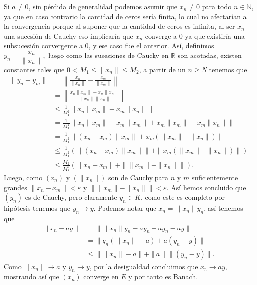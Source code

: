 \begin{sproof}
  Si $a\neq 0$, sin pérdida de generalidad podemos asumir que $x_n\neq 0$ para todo $n\in \mathbb{N}$, ya que en caso contrario la cantidad de ceros sería finita, lo cual no afectarían a la convergencia porque al suponer que la cantidad de ceros es infinita, al ser $x_n$ una sucesión de Cauchy eso implicaría que $x_n$ converge a $0$ ya que existiría una subsucesión convergente a $0$, y ese caso fue el anterior. Así, definimos $y_n=\dfrac{x_n}{\|x_n\|},$ luego como las sucesiones de Cauchy en $\mathbb{R}$ son acotadas, existen constantes tales que $0<M_1\leq\|x_n\|\leq M_2$, a partir de un $n\geq N$ tenemos que   
  \begin{align*}
      \|y_n-y_m\|&=\left\|\frac{x_n}{\|x_n\|}-\frac{x_m}{\|x_m\|}\right\|\\
      &=\left\|\frac{x_n\|x_m\|-x_m\|x_n\|}{\|x_n\|\|x_m\|}\right\|\\
      &\leq\frac{1}{M_1^2}\|x_n\|x_m\|-x_m\|x_n\|\|\\
      &=\frac{1}{M_1^2}\|x_n\|x_m\|-x_m\|x_m\|+x_m\|x_m\|-x_m\|x_n\|\|\\
      &=\frac{1}{M_1^2}\|(x_n-x_m)\|x_m\|+x_m(\|x_m\|-\|x_n\|)\|\\
      &\leq\frac{1}{M_1^2}(\|(x_n-x_m)\|x_m\|\|+\|x_m(\|x_m\|-\|x_n\|)\|)\\
      &\leq\frac{M_2}{M_1^2}(\|x_n-x_m\|+\|\|x_m\|-\|x_n\|\|)
  .\end{align*}
  Luego, como $(x_n)$ y $(\|x_n\|)$ son de Cauchy para $n$ y $m$ suficientemente grandes $\|x_n-x_m\|<\varepsilon$ y $\|\|x_m\|-\|x_n\|\|<\varepsilon.$ Así hemos concluido que $(y_n)$ es de Cauchy, pero claramente $y_n\in K$, como este es completo por hipótesis tenemos que $y_n\to y$. Podemos notar que $x_n=\|x_n\|y_n$, así tenemos que
  \begin{align*}
      \|x_n-ay\|&=\|\|x_n\|y_n-ay_n+ay_n-ay\|\\
      &=\|y_n(\|x_n\|-a)+a(y_n-y)\|\\
      &\leq\|\|x_n\|-a\|+\|a\|\|(y_n-y)\|
  .\end{align*}
  Como $\|x_n\|\to a$ y $y_n\to y$, por la desigualdad concluimos que $x_n\to ay,$ mostrando así que $(x_n)$ converge en $E$ y por tanto es Banach.










\end{sproof}